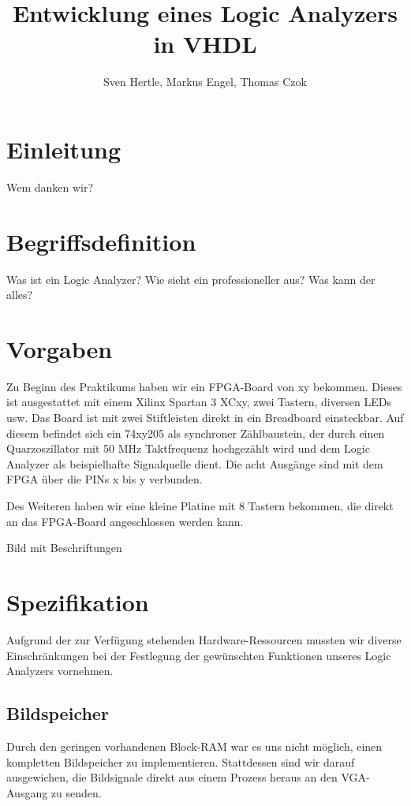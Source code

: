 \documentclass[IN,ngerman,utf8,12pt]{tumbook}
\title{Entwicklung eines Logic Analyzers in VHDL}
\author{Sven Hertle, Markus Engel, Thomas Czok}
\begin{document}
\maketitle%
\tableofcontents%
\clearpage

\chapter{Einleitung}
Wem danken wir?

\chapter{Begriffsdefinition}
Was ist ein Logic Analyzer? Wie sieht ein professioneller aus? Was kann der alles?

\chapter{Vorgaben}
Zu Beginn des Praktikums haben wir ein FPGA-Board von xy bekommen. Dieses ist ausgestattet mit einem Xilinx Spartan 3 XCxy, zwei Tastern, diversen LEDs usw. Das Board ist mit zwei Stiftleisten direkt in ein Breadboard einsteckbar. Auf diesem befindet sich ein 74xy205 als synchroner Zählbaustein, der durch einen Quarzoszillator mit 50 MHz Taktfrequenz hochgezählt wird und dem Logic Analyzer als beispielhafte Signalquelle dient. Die acht Ausgänge sind mit dem FPGA über die PINs x bis y verbunden.

Des Weiteren haben wir eine kleine Platine mit 8 Tastern bekommen, die direkt an das FPGA-Board angeschlossen werden kann.

Bild mit Beschriftungen

\chapter{Spezifikation}
Aufgrund der zur Verfügung stehenden Hardware-Ressourcen mussten wir diverse Einschränkungen bei der Festlegung der gewünschten Funktionen unseres Logic Analyzers vornehmen.

\section{Bildspeicher}
Durch den geringen vorhandenen Block-RAM war es uns nicht möglich, einen kompletten Bildspeicher zu implementieren. Stattdessen sind wir darauf ausgewichen, die Bildsignale direkt aus einem Prozess heraus an den VGA-Ausgang zu senden.
\end{document}
